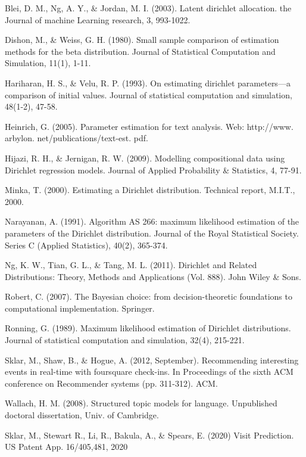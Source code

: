 \documentclass[twoside]{article}
\begin{document}
\begin{thebibliography}{20}

Blei, D. M., Ng, A. Y., \& Jordan, M. I. (2003). Latent dirichlet allocation. the Journal of machine Learning research, 3, 993-1022.

Dishon, M., \& Weiss, G. H. (1980). Small sample comparison of estimation methods for the beta distribution. Journal of Statistical Computation and Simulation, 11(1), 1-11.

Hariharan, H. S., \& Velu, R. P. (1993). On estimating dirichlet parameters—a comparison of initial values. Journal of statistical computation and simulation, 48(1-2), 47-58.

Heinrich, G. (2005). Parameter estimation for text analysis. Web: http://www. arbylon. net/publications/text-est. pdf.

Hijazi, R. H., \& Jernigan, R. W. (2009). Modelling compositional data using Dirichlet regression models. Journal of Applied Probability \& Statistics, 4, 77-91.

Minka, T. (2000). Estimating a Dirichlet distribution. Technical report, M.I.T., 2000.

Narayanan, A. (1991). Algorithm AS 266: maximum likelihood estimation of the parameters of the Dirichlet distribution. Journal of the Royal Statistical Society. Series C (Applied Statistics), 40(2), 365-374.

Ng, K. W., Tian, G. L., \& Tang, M. L. (2011). Dirichlet and Related Distributions: Theory, Methods and Applications (Vol. 888). John Wiley \& Sons.

Robert, C. (2007). The Bayesian choice: from decision-theoretic foundations to computational implementation. Springer.

Ronning, G. (1989). Maximum likelihood estimation of Dirichlet distributions. Journal of statistical computation and simulation, 32(4), 215-221.

Sklar, M., Shaw, B., \& Hogue, A. (2012, September). Recommending interesting events in real-time with foursquare check-ins. In Proceedings of the sixth ACM conference on Recommender systems (pp. 311-312). ACM.

Wallach, H. M. (2008). Structured topic models for language. Unpublished doctoral dissertation, Univ. of Cambridge.

Sklar, M., Stewart R., Li, R., Bakula, A., \& Spears, E. (2020) Visit Prediction. US Patent App. 16/405,481, 2020

\end{thebibliography}
\end{document}
